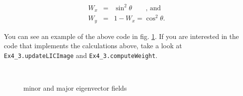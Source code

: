 \documentclass[a4paper,10pt,notitlepage]{scrartcl}
\begin{document}
\begin{eqnarray}
 W_x &=& \sin^2 \theta \qquad \text{, and}\\
 W_y &=& 1 - W_x = \cos^2 \theta .
\end{eqnarray}

You can see an example of the above code in fig. \ref{fig:tfd-majorminor}. If
you are interested in the code that implements the calculations above, take a
look at \texttt{Ex4\_3.updateLICImage} and \texttt{Ex4\_3.computeWeight}.

\begin{figure}
  \centering
  \\
  \caption{minor and major eigenvector fields}
  \label{fig:tfd-majorminor}
\end{figure}
\end{document}
